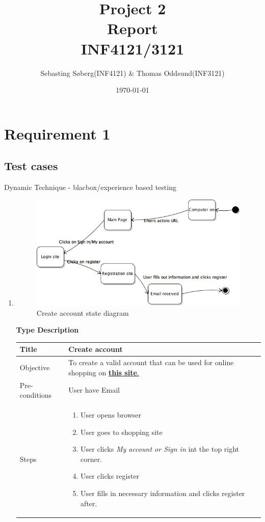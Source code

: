\documentclass[UKenglish,12pt]{article}
\title{Project 2 \\ Report \\ INF4121/3121} %
\date{\today} %
\author{Sebasting Søberg(INF4121) \& Thomas Oddsund(INF3121)}
\begin{document}
\maketitle %

\section{Requirement 1}
\subsection{Test cases}
Dynamic Technique - blacbox/experience based testing
\begin{enumerate}%
\item
\begin{figure}[!h]
\centering
\includegraphics[scale=0.7,keepaspectratio]{Images/CreateAccount.png}
\caption{Create account state diagram}
\end{figure}
\newpage
\textbf{\hspace{0.3cm}Type\hspace{4.4cm} Description}
\newline \vspace{0.2cm}
\begin{tabular}{| p{5cm} | p{10cm} | }
	\hline
	 Title & Create account\\ \hline
	 Objective & To create a valid account that can be used for online shopping on \href{http://demo.avactis.com/4.7.9/}{\textbf{this site}.} \\ \hline
	 Pre-conditions & User have Email\\ \hline
	 Steps & \begin{enumerate} \item User opens browser \item User goes to shopping site \item User clicks \textit{My account or  Sign in} int the top right corner. \item User clicks register \item User fills in necessary information and clicks register after.\end{enumerate} \\ \hline

\end{tabular}
\end{enumerate}
\end{document}
